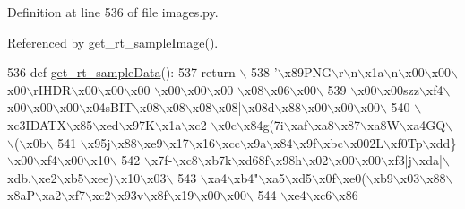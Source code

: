 Definition at line 536 of file images.\+py.



Referenced by get\+\_\+rt\+\_\+sample\+Image().


\begin{DoxyCode}
536 \textcolor{keyword}{def }\hyperlink{namespaceimages_aad3c19cd4a044581a21b4b44a2d51f64}{get\_rt\_sampleData}():
537     \textcolor{keywordflow}{return} \(\backslash\)
538 \textcolor{stringliteral}{'\(\backslash\)x89PNG\(\backslash\)r\(\backslash\)n\(\backslash\)x1a\(\backslash\)n\(\backslash\)x00\(\backslash\)x00\(\backslash\)x00\(\backslash\)rIHDR\(\backslash\)x00\(\backslash\)x00\(\backslash\)x00 \(\backslash\)x00\(\backslash\)x00\(\backslash\)x00 \(\backslash\)x08\(\backslash\)x06\(\backslash\)x00\(\backslash\)}
539 \textcolor{stringliteral}{\(\backslash\)x00\(\backslash\)x00szz\(\backslash\)xf4\(\backslash\)x00\(\backslash\)x00\(\backslash\)x00\(\backslash\)x04sBIT\(\backslash\)x08\(\backslash\)x08\(\backslash\)x08\(\backslash\)x08|\(\backslash\)x08d\(\backslash\)x88\(\backslash\)x00\(\backslash\)x00\(\backslash\)x00\(\backslash\)}
540 \textcolor{stringliteral}{\(\backslash\)xc3IDATX\(\backslash\)x85\(\backslash\)xed\(\backslash\)x97K\(\backslash\)x1a\(\backslash\)xc2 \(\backslash\)x0c\(\backslash\)x84g(7i\(\backslash\)xaf\(\backslash\)xa8\(\backslash\)x87\(\backslash\)xa8W\(\backslash\)xa4GQ\(\backslash\)\(\backslash\)(\(\backslash\)x0b\(\backslash\)}
541 \textcolor{stringliteral}{\(\backslash\)x95j\(\backslash\)x88\(\backslash\)xe9\(\backslash\)x17\(\backslash\)x16\(\backslash\)xcc\(\backslash\)x9a\(\backslash\)x84\(\backslash\)x9f\(\backslash\)xbc\(\backslash\)x002L\(\backslash\)xf0Tp\(\backslash\)xdd\}\(\backslash\)x00\(\backslash\)xf4\(\backslash\)x00\(\backslash\)x10\(\backslash\)}
542 \textcolor{stringliteral}{\(\backslash\)x7f-\(\backslash\)xc8\(\backslash\)xb7k\(\backslash\)xd68f\(\backslash\)x98h\(\backslash\)x02\(\backslash\)x00\(\backslash\)x00\(\backslash\)xf3|j\(\backslash\)xda|\(\backslash\)xdb.\(\backslash\)xe2\(\backslash\)xb5\(\backslash\)xee)\(\backslash\)x10\(\backslash\)x03\(\backslash\)}
543 \textcolor{stringliteral}{\(\backslash\)xa4\(\backslash\)xb4"\(\backslash\)xa5\(\backslash\)xd5\(\backslash\)x0f\(\backslash\)xe0(\(\backslash\)xb9\(\backslash\)x03\(\backslash\)x88\(\backslash\)x8aP\(\backslash\)xa2\(\backslash\)xf7\(\backslash\)xc2\(\backslash\)x93v\(\backslash\)x8f\(\backslash\)x19\(\backslash\)x00\(\backslash\)x00\(\backslash\)}
544 \textcolor{stringliteral}{\(\backslash\)xe4\(\backslash\)xc6\(\backslash\)x86%
}
\end{DoxyCode}
